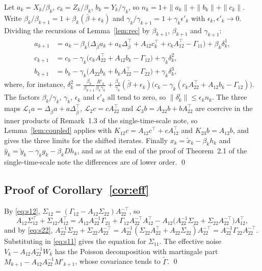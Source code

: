 \documentclass[11pt]{article}
\theoremstyle{definition}
\theoremstyle{remark}
\newcommand{\Lop}{\mathcal{L}}
\begin{document}
Let $a_k = X_k/\beta_k$, $c_k = Z_k/\beta_k$, $b_k = Y_k/\gamma_k$, so $n_k = 1 + \|a_k\| + \|b_k\| + \|c_k\|$.
Write $\beta_k/\beta_{k+1} = 1 + \beta_k(\bar\beta + \epsilon_k)$ and
$\gamma_k/\gamma_{k+1} = 1 + \gamma_k\epsilon'_k$ with $\epsilon_k, \epsilon'_k \to 0$. Dividing the
recursions of Lemma~\ref{lem:rec} by $\beta_{k+1}$, $\beta_{k+1}$ and $\gamma_{k+1}$:
\begin{align*}
  a_{k+1} &= a_k - \beta_k\big(\Delta_{\bar\beta}a_k + a_k\Delta_{\bar\beta}^\top + A_{12}c_k^\top + c_kA_{12}^\top - \Gamma_{11}\big)
    + \beta_k\delta^1_k,\\
  c_{k+1} &= c_k - \gamma_k\big(c_kA_{22}^\top + A_{12}b_k - \Gamma_{12}\big) + \gamma_k\delta^2_k,\\
  b_{k+1} &= b_k - \gamma_k\big(A_{22}b_k + b_kA_{22}^\top - \Gamma_{22}\big) + \gamma_k\delta^3_k ,
\end{align*}
where, for instance,
$\delta^2_k = \frac{\beta_k}{\beta_{k+1}}\frac{R'_k}{\beta_k\gamma_k} + \frac{\beta_k}{\gamma_k}(\bar\beta + \epsilon_k)
\big(c_k - \gamma_k(c_kA_{22}^\top + A_{12}b_k - \Gamma_{12})\big)$. The factors $\beta_k/\gamma_k$,
$\gamma_k$, $\epsilon_k$ and $\epsilon'_k$ all tend to zero, so
$\|\delta^i_k\| \le \epsilon_k n_k$. The three maps
$\Lop_1a = \Delta_{\bar\beta}a + a\Delta_{\bar\beta}^\top$, $\Lop_2c = cA_{22}^\top$ and
$\Lop_3b = A_{22}b + bA_{22}^\top$ are coercive in the inner products of
Remark~1.3 of the single-time-scale note, so Lemma~\ref{lem:coupled} applies with
$K_{12}c = A_{12}c^\top + cA_{12}^\top$ and $K_{23}b = A_{12}b$, and gives the three limits for
the shifted iterates. Finally $x_k = \tilde x_k - \beta_kh_k$ and
$\hat y_k = \tilde y_k - \gamma_kg_k - \beta_kDh_k$, and as at the end of the proof of Theorem~2.1
of the single-time-scale note the differences are of lower order.
\qed

\subsection{Proof of Corollary~\ref{cor:eff}}

By \eqref{eq:s12}, $\Sigma_{12} = (\Gamma_{12} - A_{12}\Sigma_{22})A_{22}^{-\top}$, so
\[
  A_{12}\Sigma_{12}^\top + \Sigma_{12}A_{12}^\top
  = A_{12}A_{22}^{-1}\Gamma_{21} + \Gamma_{12}A_{22}^{-\top}A_{12}^\top
    - A_{12}\big(A_{22}^{-1}\Sigma_{22} + \Sigma_{22}A_{22}^{-\top}\big)A_{12}^\top,
\]
and by \eqref{eq:s22}, $A_{22}^{-1}\Sigma_{22} + \Sigma_{22}A_{22}^{-\top}
= A_{22}^{-1}(\Sigma_{22}A_{22}^\top + A_{22}\Sigma_{22})A_{22}^{-\top} = A_{22}^{-1}\Gamma_{22}A_{22}^{-\top}$.
Substituting in \eqref{eq:s11} gives the equation for $\Sigma_{11}$. The effective noise
$V_k - A_{12}A_{22}^{-1}W_k$ has the Poisson decomposition with martingale part
$M_{k+1} - A_{12}A_{22}^{-1}M'_{k+1}$, whose covariance tends to $\tilde\Gamma$.
\qed
\end{document}
